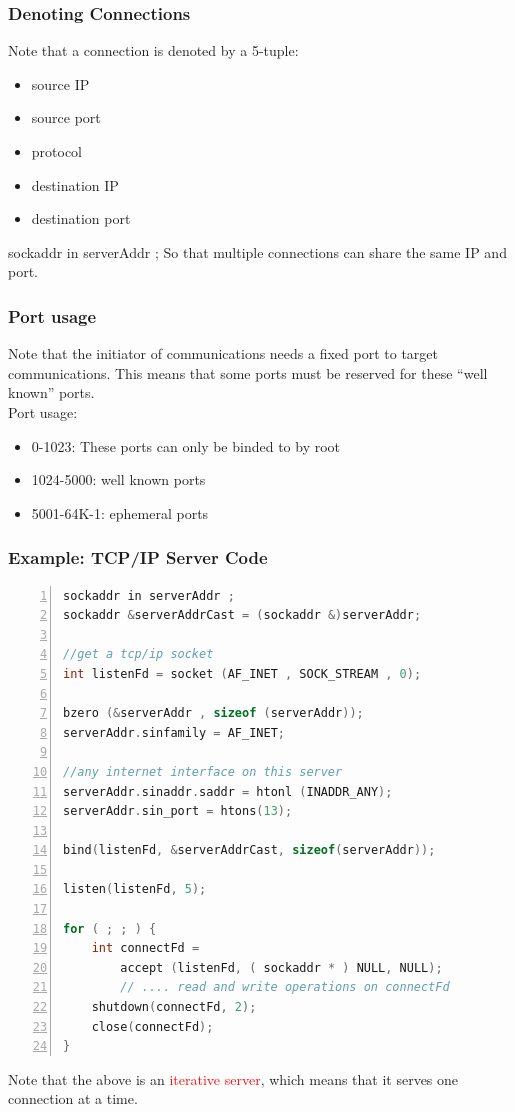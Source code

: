 \documentclass[12pt]{beamer}
\begin{document}
\begin{frame}
	\frametitle{Denoting Connections}
	{\footnotesize Note that a connection is denoted by a 5-tuple:
	\begin{itemize}
		\item source IP
		\item source port
		\item protocol
		\item destination IP
		\item destination port
	\end{itemize}sockaddr in serverAddr ;
	So that multiple connections can share the same IP and port.
	}
\end{frame}

\begin{frame}
	\frametitle{Port usage}
	{\footnotesize Note that the initiator of communications needs a fixed port to
target communications. This means that some ports must be reserved for these “well known” ports. \\Port usage:
	\begin{itemize}
		\item 0-1023: These ports can only be binded to by root
		\item 1024-5000: well known ports
		\item 5001-64K-1: ephemeral ports
	\end{itemize}
	}
\end{frame}

\begin{frame}[fragile]
	\frametitle{Example: TCP/IP Server Code}	
	{\tiny
	\begin{lstlisting}[language=C, breaklines=true, commentstyle=\color{mygreen},frame=lrtb,  rulecolor=\color{black}, numbers=left,  numbersep=5pt, numberstyle=\tiny\color{mygray}]
sockaddr in serverAddr ;
sockaddr &serverAddrCast = (sockaddr &)serverAddr;

//get a tcp/ip socket
int listenFd = socket (AF_INET , SOCK_STREAM , 0);

bzero (&serverAddr , sizeof (serverAddr));
serverAddr.sinfamily = AF_INET;

//any internet interface on this server 
serverAddr.sinaddr.saddr = htonl (INADDR_ANY);
serverAddr.sin_port = htons(13);

bind(listenFd, &serverAddrCast, sizeof(serverAddr));

listen(listenFd, 5);

for ( ; ; ) {
    int connectFd =
        accept (listenFd, ( sockaddr * ) NULL, NULL);
        // .... read and write operations on connectFd
    shutdown(connectFd, 2);
    close(connectFd);
}
	\end{lstlisting}}
	{\footnotesize
	Note that the above is an \textcolor{red}{iterative server}, which means that it serves one connection at a time.
	}
\end{frame}	
\end{document}
